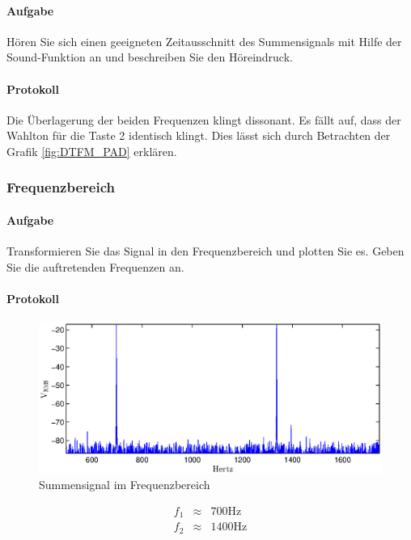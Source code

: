 \documentclass[10pt]{scrreprt}
\begin{document}
        \paragraph{Aufgabe}
        Hören Sie sich einen geeigneten Zeitausschnitt des Summensignals mit Hilfe der
        \glqq{}Sound\grqq{}-Funktion an und beschreiben Sie den Höreindruck.
        \paragraph{Protokoll}
        Die Überlagerung der beiden Frequenzen klingt dissonant. Es fällt auf, dass
        der Wahlton für die Taste 2 identisch klingt. Dies lässt sich durch
        Betrachten der Grafik \ref{fig:DTFM_PAD} erklären.


        \subsubsection{Frequenzbereich}
        \paragraph{Aufgabe}
        Transformieren Sie das Signal in den Frequenzbereich und plotten Sie es. Geben Sie
        die auftretenden Frequenzen an.
        \paragraph{Protokoll}
        \begin{center}
            \begin{figure}[H]
                \includegraphics[width=\textwidth]{Screenshot_GUI_4204_beser}
              \caption{Summensignal im Frequenzbereich}
            \end{figure}
        \end{center}
        \begin{eqnarray*}
            f_1 &\approx& 700\si{\hertz}\\
            f_2 &\approx& 1400\si{\hertz}
        \end{eqnarray*}
\end{document}
